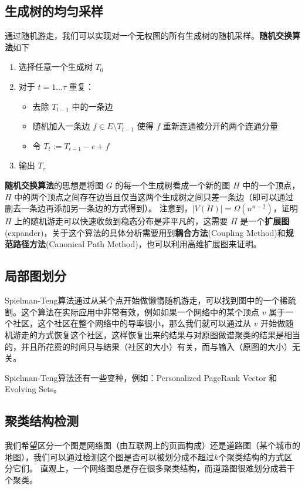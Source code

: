 \subsection{生成树的均匀采样}
通过随机游走，我们可以实现对一个无权图的所有生成树的随机采样。\textbf{随机交换算法}如下
\begin{enumerate}
    \item 选择任意一个生成树 $T_0$
    \item 对于 $t=1\dots \tau$ 重复：
    \begin{itemize}
        \item 去除 $T_{t-1}$ 中的一条边
        \item 随机加入一条边 $f\in E\setminus T_{t-1}$ 使得 $f$ 重新连通被分开的两个连通分量
        \item 令 $T_t:=T_{t-1}-e+f$
    \end{itemize}
    \item 输出 $T_\tau$
\end{enumerate}

\textbf{随机交换算法}的思想是将图 $G$ 的每一个生成树看成一个新的图 $H$ 中的一个顶点，$H$ 中的两个顶点之间存在边当且仅当这两个生成树之间只差一条边（即可以通过删去一条边再添加另一条边的方式得到）。
注意到，$|V(H)|=\Omega(n^{n-2})$，证明 $H$ 上的随机游走可以快速收敛到稳态分布是非平凡的，这需要 $H$ 是一个\textbf{扩展图}(expander)，关于这个算法的具体分析需要用到\textbf{耦合方法}(Coupling Method)和\textbf{规范路径方法}(Canonical Path Method)，也可以利用高维扩展图来证明。

\subsection{局部图划分}
Spielman-Teng算法通过从某个点开始做懒惰随机游走，可以找到图中的一个稀疏割。这个算法在实际应用中非常有效，例如如果一个网络中的某个顶点 $v$ 属于一个社区，这个社区在整个网络中的导率很小，那么我们就可以通过从 $v$ 开始做随机游走的方式恢复这个社区，这样恢复出来的结果与对原图做谱聚类的结果是相当的，并且所花费的时间只与结果（社区的大小）有关，而与输入（原图的大小）无关。

Spielman-Teng算法还有一些变种，例如：Personalized PageRank Vector 和 Evolving Sets。

\subsection{聚类结构检测}
我们希望区分一个图是网络图（由互联网上的页面构成）还是道路图（某个城市的地图），我们可以通过检测这个图是否可以被划分成不超过$k$个聚类结构的方式区分它们。
直观上，一个网络图总是存在很多聚类结构，而道路图很难划分成若干个聚类。

